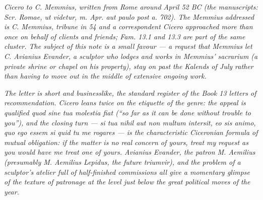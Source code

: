 
\textit{Cicero to C. Memmius, written from Rome around
April 52 BC (the manuscripts: \textit{Scr. Romae, ut
videtur, m. Apr. aut paulo post a. 702}). The Memmius
addressed is C. Memmius, tribune in 54 and a
correspondent Cicero approached more than once on
behalf of clients and friends; \textit{Fam.} 13.1 and
13.3 are part of the same cluster. The subject of this
note is a small favour --- a request that Memmius let
C. Avianius Evander, a sculptor who lodges and works
in Memmius' \textit{sacrarium} (a private shrine or
chapel on his property), stay on past the Kalends of
July rather than having to move out in the middle of
extensive ongoing work.}

\textit{The letter is short and businesslike, the
standard register of the Book 13 letters of
recommendation. Cicero leans twice on the etiquette of
the genre: the appeal is qualified \textit{quod sine
tua molestia fiat} (``so far as it can be done without
trouble to you''), and the closing turn --- \textit{si
tua nihil aut non multum intersit, eo sis animo, quo
ego essem si quid tu me rogares} --- is the
characteristic Ciceronian formula of mutual obligation:
if the matter is no real concern of yours, treat my
request as you would have me treat one of yours.
Avianius Evander, the patron M. Aemilius (presumably
M. Aemilius Lepidus, the future triumvir), and the
problem of a sculptor's atelier full of half-finished
commissions all give a momentary glimpse of the texture
of patronage at the level just below the great political
moves of the year.}

